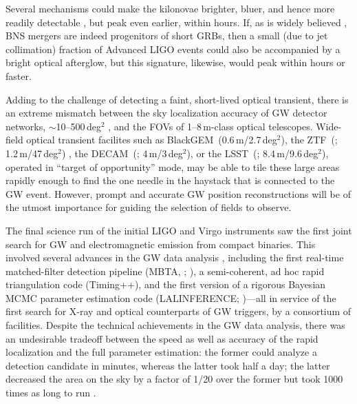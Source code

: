 \documentclass[amsmath,amssymb,aps,prx,reprint,nopreprintnumbers,nofootinbib]{revtex4-1}
\begin{document}
Several mechanisms could make the kilonovae brighter, bluer, and hence more readily detectable \citep{KilonovaPrecursor,KilonovaRedOrBlue}, but peak even earlier, within hours. If, as is widely believed \citep{1986ApJ...308L..43P,1989Natur.340..126E,1992ApJ...395L..83N,2011ApJ...732L...6R}, \ac{BNS} mergers are indeed progenitors of short \acp{GRB}, then a small (due to jet collimation) fraction of Advanced \ac{LIGO} events could also be accompanied by a bright optical afterglow, but this signature, likewise, would peak within hours or faster.

Adding to the challenge of detecting a faint, short-lived optical transient, there is an extreme mismatch between the sky localization accuracy of \ac{GW} detector networks, $\sim$10\nobreakdashes--500\,deg$^2$ \citep{FairhurstTriangulation,WenLocalizationAdvancedLIGO,FairhurstLocalizationAdvancedLIGO,2011PhRvD..84j4020V,RodriguezBasicParameterEstimation,NissankeLocalization,NissankeKasliwalEMCounterparts,KasliwalTwoDetectors,Grover:2013,SiderySkyLocalizationComparison,FirstTwoYears}, and the \acp{FOV} of 1\nobreakdashes--8\,m\nobreakdashes-class optical telescopes. Wide\nobreakdashes-field optical transient facilites such as BlackGEM~(0.6\,m/2.7\,deg$^2$), the \acl{ZTF}~(; 1.2\,m/47\,deg$^2$) \cite{ZTF}, the \acl{DECAM}~(; 4\,m/3\,deg$^2$), or the \acl{LSST}~(; 8.4\,m/9.6\,deg$^2$), operated in ``target of opportunity'' mode, may be able to tile these large areas rapidly enough to find the one needle in the haystack that is connected to the \ac{GW} event. However, prompt and accurate \ac{GW} position reconstructions will be of the utmost importance for guiding the selection of fields to observe.

The final science run of the initial LIGO and Virgo instruments saw the first joint search for \ac{GW} and electromagnetic emission from compact binaries. This involved several advances in the \ac{GW} data analysis \citep{CBCLowLatency}, including the first real\nobreakdashes-time matched\nobreakdashes-filter detection pipeline (\acs{MBTA}, ; \cite{LIGOVirgoInspiralPipelineComparison}), a semi\nobreakdashes-coherent, ad hoc rapid triangulation code (Timing++), and the first version of a rigorous Bayesian \ac{MCMC} parameter estimation code (LALINFERENCE; \citealt{S6PE})---all in service of the first search for X\nobreakdashes-ray \citep{SwiftFollowup} and optical \citep{OpticalImageAnalysis} counterparts of \ac{GW} triggers, by a consortium of facilities. Despite the technical achievements in the \ac{GW} data analysis, there was an undesirable tradeoff between the speed as well as accuracy of the rapid localization and the full parameter estimation: the former could analyze a detection candidate in minutes, whereas the latter took half a day; the latter decreased the area on the sky by a factor of 1/20 over the former but took 1000 times as long to run \cite{SiderySkyLocalizationComparison}.
\end{document}
